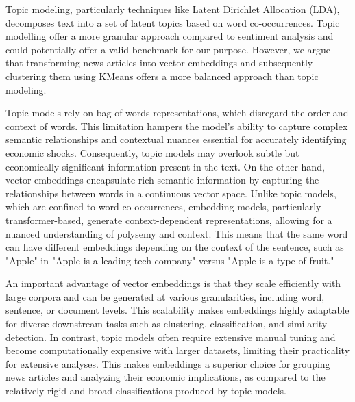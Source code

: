 Topic modeling, particularly techniques like Latent Dirichlet Allocation (LDA), decomposes text into a set of latent topics based on word co-occurrences. Topic modelling  offer a more granular approach compared to sentiment analysis and could potentially offer a valid benchmark for our purpose. However, we argue that transforming news articles into vector embeddings and subsequently clustering them using KMeans offers a more balanced approach than topic modeling.

Topic models rely on bag-of-words representations, which disregard the order and context of words. This limitation hampers the model's ability to capture complex semantic relationships and contextual nuances essential for accurately identifying economic shocks. Consequently, topic models may overlook subtle but economically significant information present in the text. On the other hand, vector embeddings encapsulate rich semantic information by capturing the relationships between words in a continuous vector space. Unlike topic models, which are confined to word co-occurrences, embedding models, particularly transformer-based, generate context-dependent representations, allowing for a nuanced understanding of polysemy and context. This means that the same word can have different embeddings depending on the context of the sentence, such as "Apple" in "Apple is a leading tech company" versus "Apple is a type of fruit." 


An important advantage of vector embeddings is that they scale efficiently with large corpora and can be generated at various granularities, including word, sentence, or document levels. This scalability makes embeddings highly adaptable for diverse downstream tasks such as clustering, classification, and similarity detection. In contrast, topic models often require extensive manual tuning and become computationally expensive with larger datasets, limiting their practicality for extensive analyses. This makes embeddings a superior choice for grouping news articles and analyzing their economic implications, as compared to the relatively rigid and broad classifications produced by topic models.

